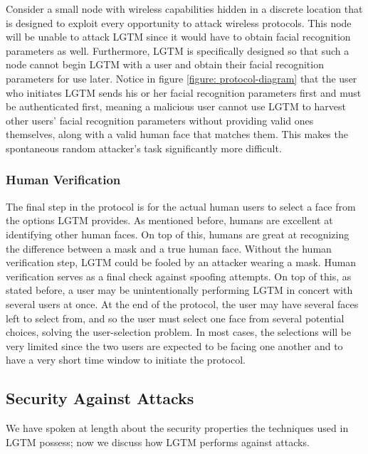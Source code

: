 \documentclass[12pt]{report}
\begin{document}
Consider a small node with wireless capabilities hidden in a discrete location that is designed to exploit every opportunity to attack wireless protocols. This node will be unable to attack LGTM since it would have to obtain facial recognition parameters as well. Furthermore, LGTM is specifically designed so that such a node cannot begin LGTM with a user and obtain their facial recognition parameters for use later. Notice in figure \ref{figure: protocol-diagram} that the user who initiates LGTM sends his or her facial recognition parameters first and must be authenticated first, meaning a malicious user cannot use LGTM to harvest other users' facial recognition parameters without providing valid ones themselves, along with a valid human face that matches them. This makes the spontaneous random attacker's task significantly more difficult. \par

\subsubsection{Human Verification}
The final step in the protocol is for the actual human users to select a face from the options LGTM provides. As mentioned before, humans are excellent at identifying other human faces. On top of this, humans are great at recognizing the difference between a mask and a true human face. Without the human verification step, LGTM could be fooled by an attacker wearing a mask. Human verification serves as a final check against spoofing attempts. On top of this, as stated before, a user may be unintentionally performing LGTM in concert with several users at once. At the end of the protocol, the user may have several faces left to select from, and so the user must select one face from several potential choices, solving the user-selection problem. In most cases, the selections will be very limited since the two users are expected to be facing one another and to have a very short time window to initiate the protocol. \par


\subsection{Security Against Attacks}
We have spoken at length about the security properties the techniques used in LGTM possess; now we discuss how LGTM performs against attacks. \par
\end{document}
